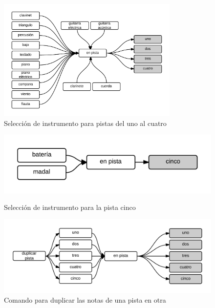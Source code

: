 \begin{figure}[H]
\centering
\includegraphics[width=0.8\textwidth]{./graphics/inst-p1-4.png}
\caption{Selecci\'on de instrumento para pistas del uno al cuatro}
\label{figure:cmd-inst-p1-4-anexo}
\end{figure} 

\begin{figure}[H]  
\begin{minipage}[b]{0.5\linewidth}
\centering
\includegraphics[width=1\linewidth]{./graphics/inst-p5.png}
\caption{Selecci\'on de instrumento para la pista cinco}
\label{figure:cmd-inst-p5-anexo}
\end{minipage}
\quad
\begin{minipage}[b]{0.5\linewidth}
\centering
\includegraphics[width=1\linewidth]{./graphics/dup-pista.png}
\caption{Comando para duplicar las notas de una pista en otra}
\label{figure:cmd-dup-pista-anexo}
\end{minipage}
\end{figure}

